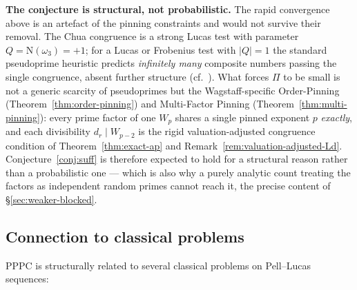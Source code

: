 \documentclass[11pt]{amsart}
\theoremstyle{plain}
\theoremstyle{definition}
\theoremstyle{remark}
\numberwithin{equation}{section}
\begin{document}
\textbf{The conjecture is structural, not probabilistic.} The rapid convergence above is an artefact of the pinning constraints and would not survive their removal. The Chua congruence is a strong Lucas test with parameter $Q = \mathrm{N}(\omega_3) = +1$; for a Lucas or Frobenius test with $|Q| = 1$ the standard pseudoprime heuristic predicts \emph{infinitely many} composite numbers passing the single congruence, absent further structure (cf.\ \cite{ref:Grantham}). What forces $\Pi$ to be small is not a generic scarcity of pseudoprimes but the Wagstaff-specific Order-Pinning (Theorem~\ref{thm:order-pinning}) and Multi-Factor Pinning (Theorem~\ref{thm:multi-pinning}): every prime factor of one $W_p$ shares a single pinned exponent $p$ \emph{exactly}, and each divisibility $d_r \mid W_{p-2}$ is the rigid valuation-adjusted congruence condition of Theorem~\ref{thm:exact-ap} and Remark~\ref{rem:valuation-adjusted-Ld}. Conjecture~\ref{conj:suff} is therefore expected to hold for a structural reason rather than a probabilistic one --- which is also why a purely analytic count treating the factors as independent random primes cannot reach it, the precise content of \S\ref{sec:weaker-blocked}.

\subsection{Connection to classical problems}

PPPC is structurally related to several classical problems on Pell--Lucas sequences:
\end{document}
